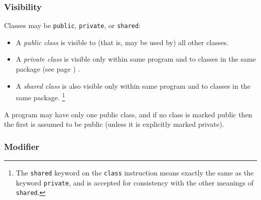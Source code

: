 \subsubsection{Visibility}
 
Classes may be \texttt{public}, \texttt{private}, or
\texttt{shared}:
\begin{itemize}
\item A \emph{public class} is visible to (that is, may be used by)
all other classes.
\item A \emph{private class} is visible only within same program and to
classes in the same  package (see page \pageref{refpackage}) .
\item A \emph{shared class} is also visible only within same program and to
classes in the same package.
\footnote{
The \texttt{shared} keyword on the \texttt{class} instruction means
exactly the same as the keyword \texttt{private}, and is accepted for
consistency with the other meanings of \texttt{shared}.
}
\end{itemize}
 
A program may have only one public class, and if no class is marked
public then the first is assumed to be public (unless it is explicitly
marked private).
\subsubsection{Modifier}
 

